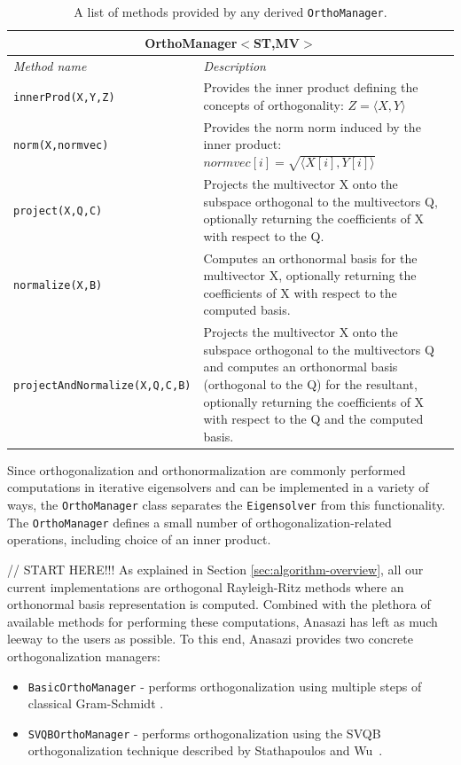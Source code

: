 \documentclass[acmtoms]{acmtrans2m}
\newcounter{algorithm}
\newcommand{\aspace}[1]{\texttt{#1}}
\begin{document}
\begin{table}[htp]
\begin{center}
\caption{A list of methods provided by any derived \aspace{OrthoManager}.} 
\label{tab:anasazi:orthomanager}
\begin{tabular}{| p{4cm} | p{6cm} |}
\hline
\multicolumn{2}{|c|}{\textbf{OrthoManager$<$ST,MV$>$}} \\\hline
\emph{Method name} & \emph{Description} \\
\hline
{\tt innerProd(X,Y,Z)} &
Provides the inner product defining the concepts of orthogonality: $Z = \langle X, Y \rangle$ \\
{\tt norm(X,normvec)} &
Provides the norm norm induced by the inner product: $normvec[i] = \sqrt{\langle X[i], Y[i] \rangle}$\\
{\tt project(X,Q,C) } &
Projects the multivector X onto the subspace orthogonal to the multivectors Q, optionally returning the coefficients of 
X with respect to the Q.\\
{\tt normalize(X,B)} &
Computes an orthonormal basis for the multivector X, optionally returning the coefficients
of X with respect to the computed basis.\\
{\tt projectAndNormalize(X,Q,C,B)} &
Projects the multivector X onto the subspace orthogonal to the multivectors Q and computes an orthonormal basis (orthogonal to the Q) 
for the resultant, optionally returning the coefficients of X with respect to the Q and the computed basis.\\
\hline
\end{tabular}
\end{center}
\end{table}



Since orthogonalization and orthonormalization are commonly performed
computations in iterative eigensolvers and can be implemented in a variety of ways, 
the \aspace{OrthoManager} class separates the \aspace{Eigensolver}
from this functionality. The \aspace{OrthoManager} defines a small number of
orthogonalization-related operations, including choice of an inner
product.

// START HERE!!!
As explained in Section
\ref{sec:algorithm-overview}, all our current implementations are
orthogonal Rayleigh-Ritz methods where an orthonormal basis
representation is computed. 
Combined with the plethora of available methods for
performing these computations, Anasazi has left as much leeway to
the users as possible. To this end, Anasazi provides two concrete
orthogonalization managers:
\begin{itemize}
\item
  \aspace{BasicOrthoManager} - performs orthogonalization using
  multiple steps of classical Gram-Schmidt \cite{dgks:76}.
\item
  \aspace{SVQBOrthoManager} - performs orthogonalization using the
  SVQB orthogonalization technique described by Stathapoulos and
  Wu~\cite{Stathopoulos:2002:BOP}.
\end{itemize}
\end{document}

